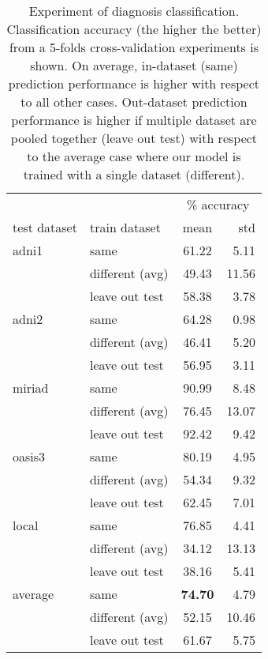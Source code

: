 \begin{table}
\centering
\caption{
Experiment of diagnosis classification.
Classification accuracy (the higher the better) from a 5-folds cross-validation experiments is shown.
On average, in-dataset (same) prediction performance is higher with respect to all other cases.
Out-dataset prediction performance is higher if multiple dataset are pooled together (leave out test) with respect to the 
average case where our model is trained with a single dataset (different).
}
\label{tab:classification}
\begin{tabular}{llcr}
\toprule
       &      &            \multicolumn{2}{c}{\% accuracy} \\
test dataset & train dataset & mean & std \\
\midrule
adni1  & same            &  61.22 & 5.11 \\
       & different (avg) &  49.43 & 11.56 \\
       & leave out test  &  58.38 & 3.78 \\
\midrule
adni2  & same            &  64.28 & 0.98 \\
       & different (avg) &  46.41 & 5.20 \\
       & leave out test  &  56.95 & 3.11 \\
\midrule
miriad & same            &  90.99 & 8.48 \\
       & different (avg) &  76.45 & 13.07 \\
       & leave out test  &  92.42 & 9.42 \\
\midrule
oasis3 & same            &  80.19 & 4.95 \\
       & different (avg) &  54.34 & 9.32 \\
       & leave out test  &  62.45 & 7.01 \\
\midrule
local  & same            &  76.85 & 4.41 \\
       & different (avg) &  34.12 & 13.13 \\
       & leave out test  &  38.16 & 5.41 \\
\midrule
\midrule
average& same            &  \textbf{74.70} & 4.79 \\
       & different (avg) &  52.15 & 10.46 \\
       & leave out test  &  61.67 & 5.75 \\
\bottomrule
\end{tabular}
\end{table}
